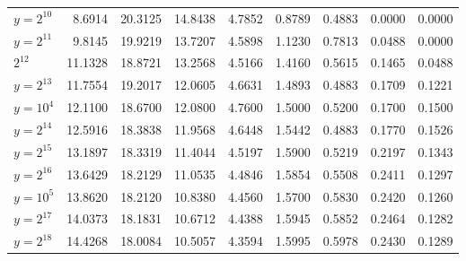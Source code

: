 \documentclass{article}
\theoremstyle{definition}
\begin{document}
\begin{table}[h!]
\begin{tabular}{l | rrrrrrrr}
        \hline
        $y = 2^{10}$  & 8.6914  & 20.3125               & 14.8438               & 4.7852                & 0.8789                & 0.4883                & 0.0000                & 0.0000                \\
        $y = 2^{11}$  & 9.8145  & 19.9219               & 13.7207               & 4.5898                & 1.1230                & 0.7813                & 0.0488                & 0.0000                \\
        $2^{12}$  & 11.1328 & 18.8721               & 13.2568               & 4.5166                & 1.4160                & 0.5615                & 0.1465                & 0.0488                \\
        $y = 2^{13}$  & 11.7554 & 19.2017               & 12.0605               & 4.6631                & 1.4893                & 0.4883                & 0.1709                & 0.1221                \\
        \hline
        $y = 10^{4}$  & 12.1100 & 18.6700               & 12.0800               & 4.7600                & 1.5000                & 0.5200                & 0.1700                & 0.1500                \\
        \hline
        $y = 2^{14}$  & 12.5916 & 18.3838               & 11.9568               & 4.6448                & 1.5442                & 0.4883                & 0.1770                & 0.1526                \\
        $y = 2^{15}$  & 13.1897 & 18.3319               & 11.4044               & 4.5197                & 1.5900                & 0.5219                & 0.2197                & 0.1343                \\
        $y = 2^{16}$  & 13.6429 & 18.2129               & 11.0535               & 4.4846                & 1.5854                & 0.5508                & 0.2411                & 0.1297                \\
        \hline
        $y = 10^{5}$  & 13.8620 & 18.2120               & 10.8380               & 4.4560                & 1.5700                & 0.5830                & 0.2420                & 0.1260                \\
        \hline
        $y = 2^{17}$  & 14.0373 & 18.1831               & 10.6712               & 4.4388                & 1.5945                & 0.5852                & 0.2464                & 0.1282                \\
        $y = 2^{18}$  & 14.4268 & 18.0084               & 10.5057               & 4.3594                & 1.5995                & 0.5978                & 0.2430                & 0.1289                \\

\end{tabular}
\end{table}
\end{document}
